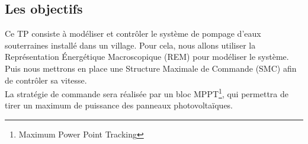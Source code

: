 \subsection{Les objectifs}
Ce TP consiste à modéliser et contrôler le système de pompage d'eaux souterraines installé dans un village. Pour cela, nous allons utiliser la Représentation Énergétique Macroscopique (REM) pour modéliser le système. Puis nous mettrons en place une Structure Maximale de Commande (SMC) afin de contrôler sa vitesse.\\
	La stratégie de commande sera réalisée par un bloc MPPT\footnote{Maximum Power Point Tracking}, qui permettra de tirer un maximum de puissance des panneaux photovoltaïques. 